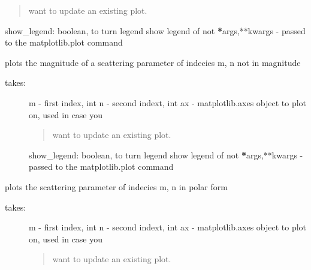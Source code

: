 \documentclass[letterpaper,10pt,english]{sphinxmanual}
\begin{document}
\begin{fulllineitems}
\begin{fulllineitems}
\begin{description}
\begin{quote}
want to update an existing plot.
\end{quote}

show\_legend: boolean, to turn legend show legend of not
{\color{red}\bfseries{}*}args,**kwargs - passed to the matplotlib.plot command

\end{description}

\end{fulllineitems}


\begin{fulllineitems}
\label{api/mwavepy:mwavepy.network.Network.plot_s_mag}
plots the magnitude of a scattering parameter of indecies m, n
not in  magnitude
\begin{description}
\item[{takes:}] \leavevmode
m - first index, int
n - second indext, int
ax - matplotlib.axes object to plot on, used in case you
\begin{quote}

want to update an existing plot.
\end{quote}

show\_legend: boolean, to turn legend show legend of not
{\color{red}\bfseries{}*}args,**kwargs - passed to the matplotlib.plot command

\end{description}

\end{fulllineitems}


\begin{fulllineitems}
\label{api/mwavepy:mwavepy.network.Network.plot_s_polar}
plots the scattering parameter of indecies m, n in polar form
\begin{description}
\item[{takes:}] \leavevmode
m - first index, int
n - second indext, int
ax - matplotlib.axes object to plot on, used in case you
\begin{quote}

want to update an existing plot.
\end{quote}


\end{description}
\end{fulllineitems}
\end{fulllineitems}
\end{document}
